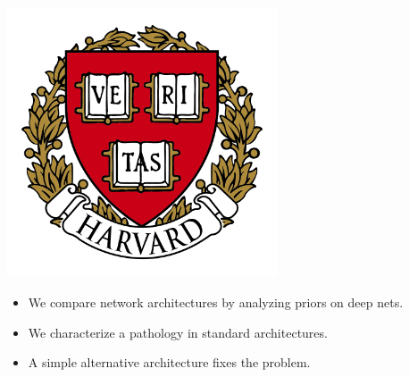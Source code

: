 \documentclass[portrait,a0b,final,a4resizeable]{include/a0poster}
\def\jointspacing{\vspace{0.3in}}
\begin{document}
\begin{poster}
\begin{center}
\begin{pcolumn}{1.03}
{{\begin{minipage}[c]{\logowidth}
\begin{flushright}
    \includegraphics[width=8cm,trim=2em 0em 2em 2em, clip]{badges/harvard}
  \end{flushright}
\end{minipage}}
%
}
\end{pcolumn}
\end{center}

\vspace*{1.5cm}

\large



\Large

\begin{multicols}{2}



\vspace*{-1cm}
\null\hspace*{3cm}\begin{minipage}[c]{0.85\columnwidth}
\centering
\begin{itemize}
\item We compare network architectures by analyzing priors on deep nets.
\item We characterize a pathology in standard architectures.
\item A simple alternative architecture fixes the problem.
\end{itemize}
\end{minipage}

\jointspacing


\center
\begin{centering}

\end{centering}



\end{multicols}
\end{poster}
\end{document}
